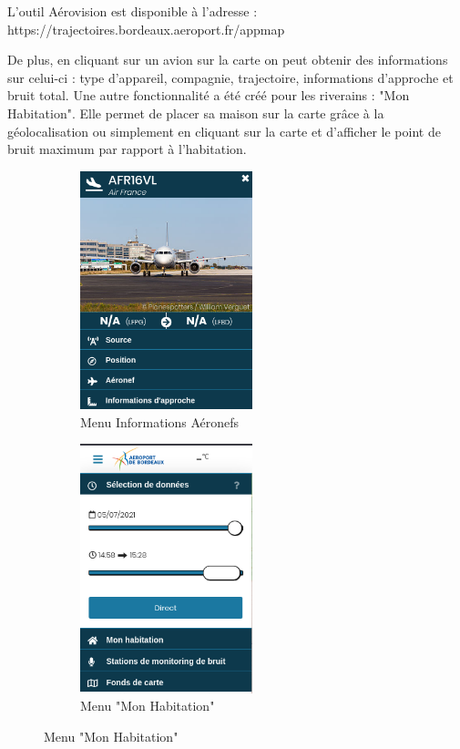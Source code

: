 L'outil Aérovision est disponible à l'adresse : https://trajectoires.bordeaux.aeroport.fr/appmap\newline

De plus, en cliquant sur un avion sur la carte on peut obtenir des informations sur celui-ci : type d'appareil, compagnie, trajectoire, informations d'approche et bruit total.
Une autre fonctionnalité a été créé pour les riverains : "Mon Habitation". Elle permet de placer sa maison sur la carte grâce à la géolocalisation ou simplement en cliquant sur la carte et d'afficher le point de bruit maximum par rapport à l'habitation.

\begin{figure}[hbt!]
  \begin{subfigure}{0.5\textwidth}
    \centering
    \includegraphics[width=5cm]{Images/aerovisioninfo.png}  
    \caption{Menu Informations Aéronefs}
    \label{fig:aerovisioninfo}
  \end{subfigure}
  \begin{subfigure}{0.5\textwidth}
    \centering
    \includegraphics[width=5cm]{Images/aerovisionmaison.png}  
    \caption{Menu "Mon Habitation"}
    \label{fig:aerovisionmaison}
  \end{subfigure}
\end{figure}

